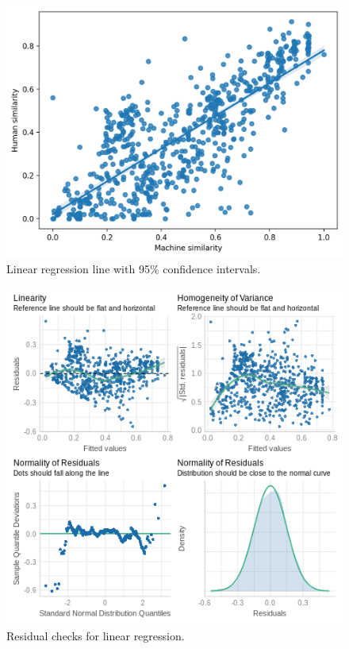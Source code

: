 \documentclass[man]{apa7}
\begin{document}
\begin{figure}
    \centering
    \includegraphics[width=\textwidth]{figures/regplot.png}
    \caption{Linear regression line with 95\% confidence intervals.}
    \label{fig:regplot}
\end{figure}

\begin{figure}
    \centering
    \includegraphics[width=\textwidth]{figures/assumptions.png}
    \caption{Residual checks for linear regression.}
    \label{fig:assumptions}
\end{figure}
\end{document}
